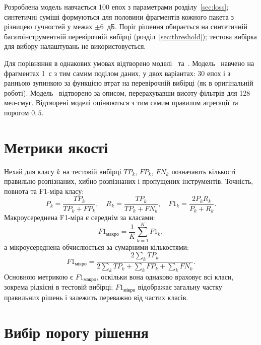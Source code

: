 Розроблена модель навчається 100 епох з параметрами
розділу~\ref{sec:loss}; синтетичні суміші формуються для половини
фрагментів кожного пакета з різницею гучностей у межах $\pm 6$~дБ. Поріг
рішення обирається на синтетичній багатоінструментній перевірочній
вибірці (розділ~\ref{sec:threshold}); тестова вибірка для вибору
налаштувань не використовується.

Для порівняння в однакових умовах відтворено моделі~\cite{han2017}
та~\cite{pons2017}. Модель~\cite{han2017} навчено на фрагментах 1~с з
тим самим поділом даних, у двох варіантах: 30 епох і з ранньою зупинкою
за функцією втрат на перевірочній вибірці (як в оригінальній роботі).
Модель~\cite{pons2017} відтворено за описом, перерахувавши висоту фільтрів
для 128 мел-смуг. Відтворені моделі оцінюються з тим самим правилом
агрегації та порогом $0{,}5$.

\section{Метрики якості}
\label{sec:metrics}

Нехай для класу $k$ на тестовій вибірці $TP_k$, $FP_k$, $FN_k$ позначають
кількості правильно розпізнаних, хибно розпізнаних і пропущених
інструментів. Точність, повнота та F1-міра класу:
\begin{equation}
    P_k = \frac{TP_k}{TP_k + FP_k}, \quad
    R_k = \frac{TP_k}{TP_k + FN_k}, \quad
    F1_k = \frac{2 P_k R_k}{P_k + R_k}.
\end{equation}
Макроусереднена F1-міра є середнім за класами:
\begin{equation}
    F1_{\text{макро}} = \frac{1}{K} \sum_{k=1}^{K} F1_k,
\end{equation}
а мікроусереднена обчислюється за сумарними кількостями:
\begin{equation}
    F1_{\text{мікро}} = \frac{2 \sum_k TP_k}{2 \sum_k TP_k + \sum_k FP_k + \sum_k FN_k}.
\end{equation}
Основною метрикою є $F1_{\text{макро}}$, оскільки вона однаково враховує
всі класи, зокрема рідкісні в тестовій вибірці; $F1_{\text{мікро}}$
відображає загальну частку правильних рішень і залежить переважно від
частих класів.

\section{Вибір порогу рішення}
\label{sec:thr_results}

